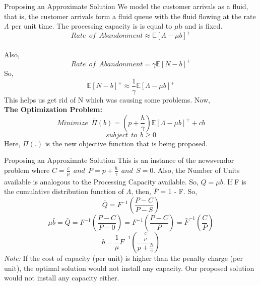 \documentclass[9pt]{beamer}
\begin{document}
\begin{frame}{Proposing an Approximate Solution}
We model the customer arrivals as a fluid, that is, the customer arrivals form a fluid queue with the fluid flowing at the rate $\Lambda$ per unit time. The processing
capacity is is equal to $\mu$b and is fixed. \\
\[Rate \ \ of \ \ Abandonment \approx \mathbb{E}[\Lambda - \mu b]^+\] \\
Also, 
\[Rate \ \ of \ \ Abandonment = \gamma\mathbb{E}[N - b]^+\]
So,
\[\mathbb{E}[N - b]^+ \approx \frac{1}{\gamma} \mathbb{E}[\Lambda - \mu b]^+   \] 
This helps us get rid of N which was causing some problems. Now, \\ \bigskip
\textbf{The Optimization Problem:}\\ 
\[Minimize \ \ \bar{\Pi}(b)=(p + \frac{h}{\gamma})\mathbb{E}[\Lambda - \mu b]^+ + cb\]     
\[subject \ \ to \ \ b \geq 0\]     
Here, $\bar{\Pi}(.)$ is the new objective function that is being proposed. \\
\end{frame} 

\begin{frame}{Proposing an Approximate Solution}
This is an instance of the newsvendor problem where $C=\frac{c}{\mu} \ \ and \ \ P=p + \frac{h}{\gamma} \ \ and \ \ S=0$. Also, the Number of Units available is analogous to the Processing Capacity available. So, $Q=\mu b$. If F is the cumulative distribution function of $\Lambda$, then, $\bar{F}$ = 1 - F.
So, \\
\[\bar{Q}=F^{-1}(\frac{P-C}{P-S})\]
\[\mu \bar{b}=\bar{Q}=F^{-1}(\frac{P-C}{P-0})=F^{-1}(\frac{P-C}{P})=\bar{F}^{-1}(\frac{C}{P})\]
\[\bar{b}=\frac{1}{\mu}\bar{F}^{-1}(\frac{\frac{c}{\mu}}{p + \frac{h}{\gamma}})\]
\textit{Note:} If the cost of capacity (per unit) is higher than the penalty charge (per unit), the optimal solution would not install any capacity. Our proposed solution would not install any capacity either.
\end{frame} 
\end{document}

